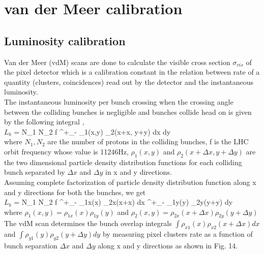  \section{van der Meer calibration}
 \label{sec:vdm}

 \subsection{Luminosity calibration}
Van der Meer (vdM) scans are done to calculate the visible cross section $\sigma_{vis}$ of the pixel detector which is a calibration constant in the relation between rate of a quantity (clusters, coincidences) read out by the detector and the instantaneous luminosity. \\

The instantaneous luminosity  per bunch crossing when the crossing angle between the colliding bunches is negligible and bunches collide head on is given by the following integral \cite{CMS-PAS-LUM-13-001}, \\

$L_{b}$ = N_1 N_2 f \int^{+\infty}_{-\infty} \rho_1(x,y) \rho_2(x+\Delta x, y+\Delta y) dx dy \\

where $N_1, N_2$ are the number of protons in the colliding bunches, f is the LHC orbit frequency whose value is 11246Hz,  $\rho_1(x,y)$ and $\rho_2(x+\Delta x,y+\Delta y)$ are the two dimensional particle density distribution functions for each colliding bunch separated by $\Delta x$ and $\Delta y$ in x and y directions. \\

Assuming complete factorization of particle density distribution function along x and y directions for both the bunches, we get \\

$L_{b}$ = N_1 N_2 f \int^{+\infty}_{-\infty} \rho_{1x}(x) \rho_{2x}(x+\Delta x)  dx   \int^{+\infty}_{-\infty} \rho_{1y}(y) \rho_{2y}(y+\Delta y)  dy \\

where $\rho_1(x,y) = \rho_{1x}(x) \rho_{1y} (y)$ and $\rho_2(x,y) = \rho_{2x}(x+\Delta x) \rho_{2y} (y+\Delta y)$ \\

The vdM scan determines the bunch  overlap integrals $\int \rho_{x1} (x) \rho_{x2} (x+\Delta x) dx$ and  $\int \rho_{y1}(y) \rho_{y2} (y+\Delta y) dy$ by measuring pixel clusters rate as a function of bunch separation $\Delta x$ and $\Delta y$ along x and y directions as shown in Fig. 14. \\


